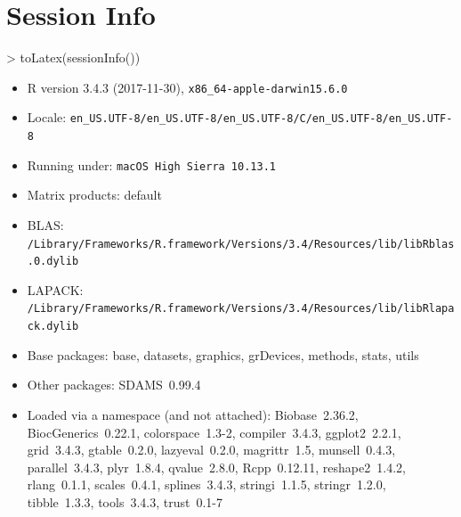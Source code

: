 \documentclass[12pt]{article}
\begin{document}
\section{Session Info}

\begin{Schunk}
\begin{Sinput}
> toLatex(sessionInfo())
\end{Sinput}
\begin{itemize}\raggedright
  \item R version 3.4.3 (2017-11-30), \verb|x86_64-apple-darwin15.6.0|
  \item Locale: \verb|en_US.UTF-8/en_US.UTF-8/en_US.UTF-8/C/en_US.UTF-8/en_US.UTF-8|
  \item Running under: \verb|macOS High Sierra 10.13.1|
  \item Matrix products: default
  \item BLAS: \verb|/Library/Frameworks/R.framework/Versions/3.4/Resources/lib/libRblas.0.dylib|
  \item LAPACK: \verb|/Library/Frameworks/R.framework/Versions/3.4/Resources/lib/libRlapack.dylib|
  \item Base packages: base, datasets, graphics, grDevices, methods,
    stats, utils
  \item Other packages: SDAMS~0.99.4
  \item Loaded via a namespace (and not attached): Biobase~2.36.2,
    BiocGenerics~0.22.1, colorspace~1.3-2, compiler~3.4.3,
    ggplot2~2.2.1, grid~3.4.3, gtable~0.2.0, lazyeval~0.2.0,
    magrittr~1.5, munsell~0.4.3, parallel~3.4.3, plyr~1.8.4,
    qvalue~2.8.0, Rcpp~0.12.11, reshape2~1.4.2, rlang~0.1.1,
    scales~0.4.1, splines~3.4.3, stringi~1.1.5, stringr~1.2.0,
    tibble~1.3.3, tools~3.4.3, trust~0.1-7
\end{itemize}\end{Schunk}



\end{document}
